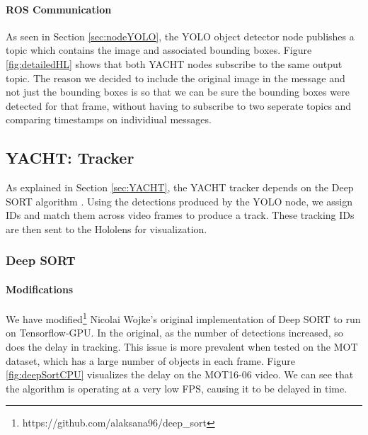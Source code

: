 \paragraph{ROS Communication} As seen in Section \ref{sec:nodeYOLO}, the YOLO object detector node publishes a topic which contains the image and associated bounding boxes. Figure \ref{fig:detailedHL} shows that both YACHT nodes subscribe to the same output topic. The reason we decided to include the original image in the message and not just the bounding boxes is so that we can be sure the bounding boxes were detected for that frame, without having to subscribe to two seperate topics and comparing timestamps on individiual messages.

\subsection{YACHT: Tracker}
As explained in Section \ref{sec:YACHT}, the YACHT tracker depends on the Deep SORT algorithm \cite{Wojke2018}. Using the detections produced by the YOLO node, we assign IDs and match them across video frames to produce a track. These tracking IDs are then sent to the Hololens for visualization.


\subsubsection{Deep SORT} 

\paragraph{Modifications} We have modified\footnote{https://github.com/alaksana96/deep\_sort} Nicolai Wojke's original implementation of Deep SORT to run on Tensorflow-GPU. In the original, as the number of detections increased, so does the delay in tracking. This issue is more prevalent when tested on the MOT dataset, which has a large number of objects in each frame. Figure \ref{fig:deepSortCPU} visualizes the delay on the MOT16-06 video. We can see that the algorithm is operating at a very low FPS, causing it to be delayed in time. 

